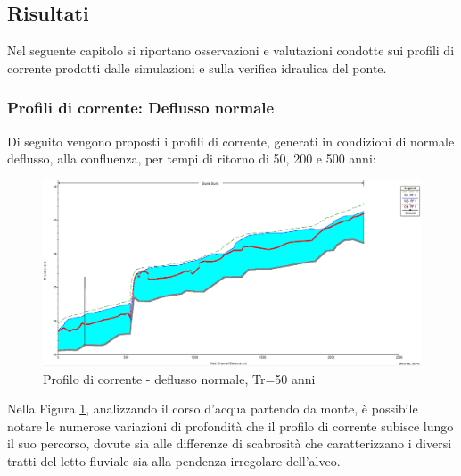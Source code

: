 \documentclass[12pt]{article} %
\begin{document}
\newpage
\subsection{Risultati}

\noindent Nel seguente capitolo si riportano osservazioni e valutazioni condotte sui profili di corrente prodotti dalle simulazioni e sulla verifica idraulica del ponte.

\subsubsection{Profili di corrente: Deflusso normale}

\noindent Di seguito vengono proposti i profili di corrente, generati in condizioni di normale deflusso, alla confluenza, per tempi di ritorno di 50, 200 e 500 anni:
\begin{figure}[H]
    \centering
    \includegraphics[scale=0.5]{ProfU474.PNG}
    \caption{Profilo di corrente - deflusso normale, Tr=50 anni}
    \label{fig:normale_50}
\end{figure}

\noindent Nella Figura \ref{fig:normale_50}, analizzando il corso d'acqua partendo da monte, è possibile notare le numerose variazioni di profondità che il profilo di corrente subisce lungo il suo percorso, dovute sia alle differenze di scabrosità che caratterizzano i diversi tratti del letto fluviale sia alla pendenza irregolare dell'alveo.
\end{document}
